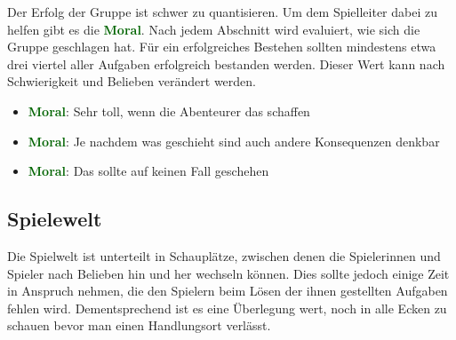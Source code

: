 \newcommand{\Moral}[1][]{\textbf{\textcolor{darkgreen}{Moral\ifthenelse{\equal{#1}{}}{}{$\;(#1)$}}}}

Der Erfolg der Gruppe ist schwer zu quantisieren. Um dem Spielleiter dabei zu helfen
gibt es die \Moral. Nach jedem Abschnitt wird evaluiert, wie sich die Gruppe
geschlagen hat. Für ein erfolgreiches Bestehen sollten mindestens etwa drei viertel
aller Aufgaben erfolgreich bestanden werden. Dieser Wert kann nach Schwierigkeit und
Belieben verändert werden.

\begin{itemize}
\item \Moral[++]: Sehr toll, wenn die Abenteurer das schaffen
\item \Moral[+/0/-]: Je nachdem was geschieht sind auch andere Konsequenzen denkbar
\item \Moral[--]: Das sollte auf keinen Fall geschehen
\end{itemize}

\subsection*{Spielewelt}
\label{ssec:world}

Die Spielwelt ist unterteilt in Schauplätze, zwischen denen die Spielerinnen und
Spieler nach Belieben hin und her wechseln können. Dies sollte jedoch einige Zeit in
Anspruch nehmen, die den Spielern beim Lösen der ihnen gestellten Aufgaben fehlen
wird. Dementsprechend ist es eine Überlegung wert, noch in alle Ecken zu schauen
bevor man einen Handlungsort verlässt.

